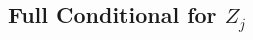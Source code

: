 \documentclass[12pt,letterpaper]{article}
\newcommand{\1}[1]{\mathbb{I}\!\left[#1\right]} %
\begin{document}
%



\subsection{Full Conditional for $Z_j$}\label{sec:joint-distribution}
\end{document}
